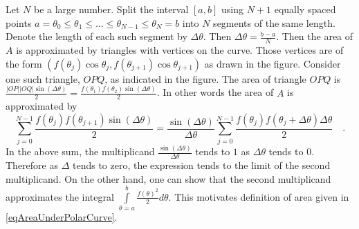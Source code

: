 \documentclass[12pt]{book}
\renewcommand{\optionalDisplay}[1]{}
\begin{document}
\optionalDisplay{
\begin{pspicture*}(-4,-1)(7.3,5.4)
\newcommand{\dThetA}{20}
\rput(4,5){$r=f(\theta)$}
\psaxes[labels=none]{<->}(0,0)(-3.5,-0.5)(4.5,5.2)
\multido{\rb=10+\dThetA}{6}{%
\pstVerb{/rR \rb\space 30 div 2 add def
/rRPlusTheta \rb\space \dThetA\space add 30 div 2 add def
}
\pscustom[fillcolor=blue!30, fillstyle=solid, linecolor=blue]{\psline(0,0)(! rR \rb \space cos mul rR \rb \space sin mul) (! rRPlusTheta \rb \space\dThetA\space add cos mul rRPlusTheta \rb \space \dThetA\space add sin mul) }
}
\parametricplot[linecolor=red, plotpoints=500]{10}{130}
{ t 30 div 2 add  t cos mul
  t 30 div 2 add  t sin mul}
\parametricplot[linecolor=red]{30}{50} %
{t cos 1 mul
 t sin 1 mul }
\rput[lt](0.8, 0.8){\tiny$\Delta\theta$}
\parametricplot[linecolor=red, arrows=->]{0}{30} %
{t cos 0.5 mul
 t sin 0.5 mul }
\rput[lt](0.55,0.3){\tiny$\theta_1$}
\parametricplot[linecolor=red, arrows=->]{0}{50} %
{t cos 0.85 mul
 t sin 0.85 mul }
\rput[lt](0.85,0.4){\tiny$\theta_2$}

\rput[tr] (-0.1,-0.1){$O$}
\rput[tl] (2.7,1.5){$P=(f(\theta_1)\cos \theta_1, f(\theta_1)\sin \theta_1)$}
\rput[tl] (2.51,2.95){$Q=(f(\theta_2)\cos \theta_2, f(\theta_2)\sin \theta_2)$}
\end{pspicture*}
} %

Let $N$ be a large number. Split the interval $[a,b]$ using $N+1$ equally spaced points $a=\theta_0 \leq\theta_1 \leq\dots \leq \theta_{N-1}\leq \theta_N=b$ into $N$ segments of the same length. Denote the length of each such segment by $\Delta \theta$. Then $\Delta\theta= \frac{b-a}{N}$. Then the area of $A$ is approximated by triangles with vertices on the curve. Those vertices are of the form $(f(\theta_j)\cos \theta_j, f(\theta_{j+1} )\cos \theta_{j+1})$ as drawn in the figure. Consider one such triangle, $OPQ$, as indicated in the figure. The area of triangle $OPQ $ is $\frac{|OP| |OQ|\sin (\Delta \theta )}{2}= \frac{f(\theta_1) f(\theta_2)\sin (\Delta \theta )}{2} $. In other words the area of $A$ is approximated by
\[
\sum_{j=0}^{N-1} \frac{f(\theta_j)f(\theta_{j+1})\sin (\Delta \theta )}{2}= \frac{\sin(\Delta\theta)}{ \Delta \theta } \sum_{j= 0}^{N-1} \frac{f(\theta_j)f(\theta_{j}+ \Delta\theta) \Delta \theta}{2}\quad .
\]
In the above sum, the multiplicand $\frac{ \sin( \Delta \theta )}{ \Delta\theta}$ tends to $1$ as $\Delta\theta$ tends to $0$. Therefore as $\Delta$ tends to zero, the expression tends to the limit of the second multiplicand. On the other hand, one can show that the second multiplicand approximates the integral $\int\limits_{\theta=a}^b \frac{f(\theta)^2}{2}d\theta$. This motivates definition of area given in \eqref{eqAreaUnderPolarCurve}.
\end{document}
